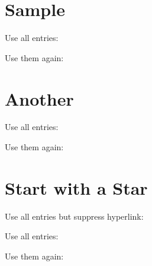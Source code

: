\documentclass{report}
\begin{document}
\chapter{Sample}

Use all entries: 

Use them again:  

\chapter{Another}

Use all entries: 

Use them again:  

\chapter{Start with a Star}

Use all entries but suppress hyperlink:

Use all entries: 

Use them again:  

\printglossaries
\end{document}
